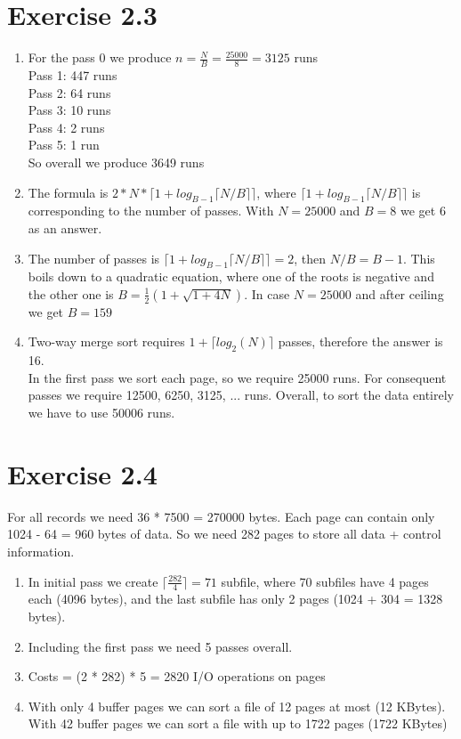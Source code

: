 \documentclass[10pt]{article}
\begin{document}
  \section*{Exercise 2.3}
   \begin{enumerate}[label=\arabic*.]
      \item
      	For the pass 0 we produce $n = \frac{N}{B} = \frac{25000}{8} = 3125$ runs\\
        Pass 1: 447 runs\\
        Pass 2: 64 runs\\
        Pass 3: 10 runs\\
        Pass 4: 2 runs\\
        Pass 5: 1 run\\[3pt]
        So overall we produce 3649 runs
      \item
        The formula is $2*N*\lceil 1+log_{B-1} \lceil N/B \rceil \rceil$, where
        $\lceil 1+log_{B-1} \lceil N/B \rceil \rceil$ is corresponding to the number
        of passes. With $N = 25000$ and $B = 8$ we get $6$ as an answer.
      \item
      	The number of passes is $\lceil 1+log_{B-1} \lceil N/B \rceil \rceil = 2$,
        then $N/B = B-1$. This boils down to a quadratic equation, where one of the
        roots is negative and the other one is $B = \frac{1}{2}(1+\sqrt{1+4N})$. In case $N = 25000$
        and after ceiling we get $B = 159$
      \item
        Two-way merge sort requires $1 + \lceil log_2(N) \rceil$ passes, therefore
        the answer is 16. \\
        In the first pass we sort each page, so we require 25000 runs. For consequent passes we require 12500, 6250, 3125, ... runs. Overall, to sort the data entirely we have to use 50006 runs.
  \end{enumerate}

  \section*{Exercise 2.4}
  For all records we need 36 * 7500 = 270000 bytes. Each page can contain only 1024 - 64 = 960 bytes of data. So we need 282 pages to store all data + control information.
   \begin{enumerate}[label=\arabic*.]
      \item
      	In initial pass we create $\lceil \frac{282}{4} \rceil = 71$ subfile, where 70 subfiles have 4 pages each (4096 bytes), and the last subfile has only 2 pages (1024 + 304 = 1328 bytes).
      \item
      	Including the first pass we need 5 passes overall.
      \item
      	Costs = (2 * 282) * 5 = 2820 I/O operations on pages
      \item
      	With only 4 buffer pages we can sort a file of 12 pages at most (12 KBytes).\\
      	With 42 buffer pages we can sort a file with up to 1722 pages (1722 KBytes) 

  \end{enumerate}
\end{document}

